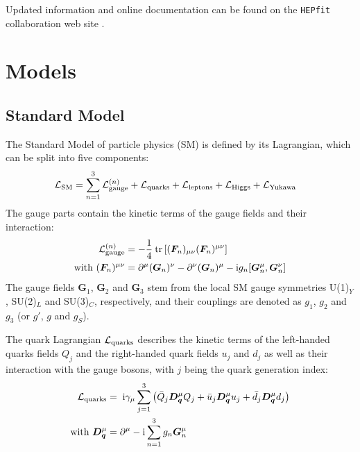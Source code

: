 \documentclass[preprint,3p,12pt]{elsarticle}
\newcommand{\HEPfit}{\texttt{HEPfit}\xspace}
\begin{document}
Updated information and online documentation can be found on the
\HEPfit collaboration web site \cite{website}.




\section{Models}
\label{sec:Models}

\subsection{Standard Model}
\label{sec:SM}

The Standard Model of particle physics (SM) is defined by its Lagrangian, which can be split into five components:
\begin{align*}
{\cal L}_{\rm SM} & = \sum\limits_{n=1}^3 {\cal L}_{\rm gauge}^{(n)} + {\cal L}_{\rm quarks}+ {\cal L}_{\rm leptons} + {\cal L}_{\rm Higgs} + {\cal L}_{\rm Yukawa}
\end{align*}
The gauge parts contain the kinetic terms of the gauge fields and their interaction:
\begin{align*}
{\cal L}_{\rm gauge}^{(n)} & = -\frac{1}{4}\: {\rm tr} \left[(\bm{F}_n)_{\mu \nu }(\bm{F}_n)^{\mu \nu}\right]\\
\text{with } (\bm{F}_n)^{\mu \nu} & = \partial ^\mu (\bm{G}_n)^\nu -\partial ^\nu (\bm{G}_n)^\mu -{\rm i}g_n[\bm{G}_n^\mu,\bm{G}_n^\nu ]
\end{align*}
The gauge fields $\bm{G}_1$, $\bm{G}_2$ and $\bm{G}_3$ stem from the local SM gauge symmetries U(1)$_Y$, SU(2)$_L$ and SU(3)$_C$, respectively, and their couplings are denoted as $g_1$, $g_2$ and $g_3$ (or $g'$, $g$ and $g_S$).

The quark Lagrangian ${\cal L}_{\rm quarks}$ describes the kinetic terms of the left-handed quarks fields $Q_j$ and the right-handed quark fields $u_j$ and $d_j$ as well as their interaction with the gauge bosons, with $j$ being the quark generation index:
\begin{align*}
{\cal L}_{\rm quarks} & = \; {\rm i}\gamma _\mu \sum\limits_{j=1}^3 \left( \bar{Q}_j \bm{D_q}^\mu Q_j + \bar{u}_j \bm{D_q}^\mu u_j + \bar{d}_j \bm{D_q}^\mu d_j \right) \\
\text{with } \bm{D_q}^\mu & = \partial ^\mu -{\rm i}\sum\limits_{n=1}^3 g_n \bm{G}_n^\mu
\end{align*}
\end{document}
